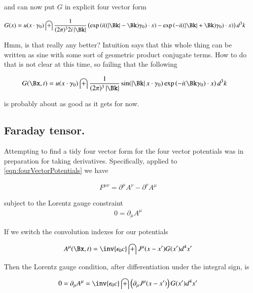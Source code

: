 \documentclass{article}
\begin{document}
and can now put $G$ in explicit four vector form

\begin{align*}
G(x)
&= u(x \cdot \gamma_0) \int
\frac{1}{(2\pi)^3 2 i \Abs{\Bk}}
\left(
\exp\left( i ((\Abs{\Bk} -\Bk)\gamma_0) \cdot x \right)
-\exp\left( -i ((\Abs{\Bk} +\Bk)\gamma_0) \cdot x \right)
\right)
d^3 k
\end{align*}

Hmm, is that really any better?  Intuition says that this whole thing 
can be written as sine with some sort of geometric product conjugate 
terms.  How to do that is not clear at this time, so failing that the following

\begin{align*}
G(\Bx, t)
&= u(x \cdot \gamma_0) \int
\frac{1}{(2\pi)^3 \Abs{\Bk}}
\sin( \Abs{\Bk} x \cdot \gamma_0 )
\exp\left( -i (\Bk \gamma_0) \cdot x \right)
d^3 k
\end{align*}

is probably about as good as it gets for now.

\subsection{ Faraday tensor. }

Attempting to find a tidy four vector form for the four vector potentials was in preparation for taking derivatives.
Specifically, applied to \ref{eqn:fourVectorPotentials} we have

\begin{align*}
F^{\mu\nu} = \partial^\mu A^\nu - \partial^\nu A^\mu
\end{align*}

subject to the Lorentz gauge constraint
\begin{align*}
0 = \partial_\mu A^\mu
\end{align*}

If we switch the convolution indexes for our potentials

\begin{align*}
{A^\mu}(\Bx, t) &= \inv{\epsilon_0 c} \int J^\mu(x - x') G(x') d^4 x' \\
\end{align*}

Then the Lorentz gauge condition, after differentiation under the integral sign, is

\begin{align*}
0 = \partial_\mu A^\mu &= \inv{\epsilon_0 c} \int \left(\partial_\mu J^\mu(x - x') \right) G(x') d^4 x' \\
\end{align*}
\end{document}
